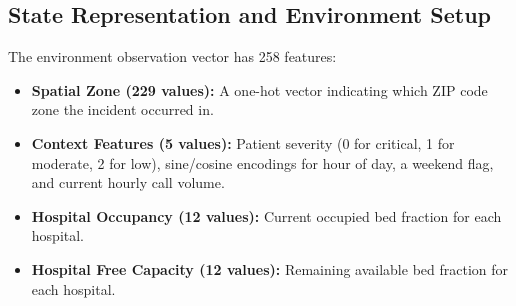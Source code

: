 \documentclass[11pt,a4paper]{article}
\begin{document}
\begin{table}[H]
    \centering
    \caption{Key Characteristics of the Processed EMS Dataset.}
    \label{tab:ems_summary}
\end{table}

\subsection{State Representation and Environment Setup}
The environment observation vector has 258 features:
\begin{itemize}[leftmargin=*]
    \item \textbf{Spatial Zone (229 values):} A one-hot vector indicating which ZIP code zone the incident occurred in.
    \item \textbf{Context Features (5 values):} Patient severity (0 for critical, 1 for moderate, 2 for low), sine/cosine encodings for hour of day, a weekend flag, and current hourly call volume.
    \item \textbf{Hospital Occupancy (12 values):} Current occupied bed fraction for each hospital.
    \item \textbf{Hospital Free Capacity (12 values):} Remaining available bed fraction for each hospital.
\end{itemize}
\end{document}
